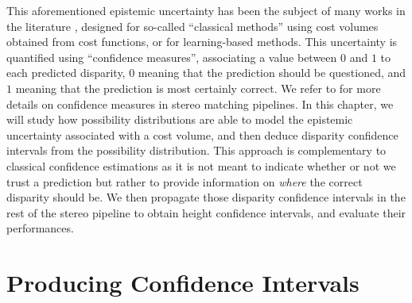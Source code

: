 This aforementioned epistemic uncertainty has been the subject of many works in the literature \cite{hu_quantitative_2012,  poggi_confidence_2021,wang_uncertainty_2022}, designed for so-called ``classical methods'' using cost volumes obtained from cost functions, or for learning-based methods. This uncertainty is quantified using ``confidence measures'', associating a value between $0$ and $1$ to each predicted disparity, $0$ meaning that the prediction should be questioned,  and $1$ meaning that the prediction is most certainly correct. We refer to  for more details on confidence measures in stereo matching pipelines. In this chapter, we will study how possibility distributions are able to model the epistemic uncertainty associated with a cost volume, and then deduce disparity confidence intervals from the possibility distribution. This approach is complementary to classical confidence estimations as it is not meant to indicate whether or not we trust a prediction but rather to provide information on \textit{where} the correct disparity should be. We then propagate those disparity confidence intervals in the rest of the stereo pipeline to obtain height confidence intervals, and evaluate their performances.

\section{Producing Confidence Intervals}
